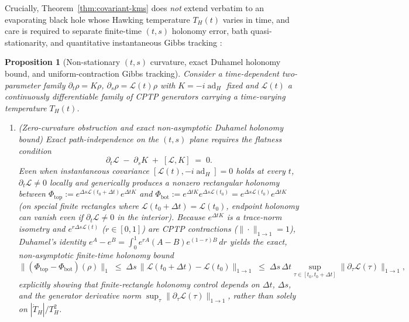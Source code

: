 \documentclass[11pt,a4paper]{article}
\newtheorem{proposition}{Proposition}
\theoremstyle{definition}
\theoremstyle{remark}
\newcommand{\ad}{\operatorname{ad}}
\newcommand{\cL}{\mathcal{L}}
\newcommand{\1}{\mathbf{1}}
\begin{document}
Crucially, Theorem~\ref{thm:covariant-kms} does \emph{not} extend verbatim to an evaporating black hole whose Hawking temperature $T_H(t)$ varies in time, and care is required to separate finite-time $(t,s)$ holonomy error, bath quasi-stationarity, and quantitative instantaneous Gibbs tracking \cite{ChetriteMallick2012,HorowitzSagawa2014}:

\begin{proposition}[Non-stationary $(t,s)$ curvature, exact Duhamel holonomy bound, and uniform-contraction Gibbs tracking]\label{prop:nonstationary}
Consider a time-dependent two-parameter family $\partial_t\rho = K\rho$, $\partial_s\rho = \cL(t)\rho$ with $K = -i\ad_H$ fixed and $\cL(t)$ a continuously differentiable family of CPTP generators carrying a time-varying temperature $T_H(t)$.
\begin{enumerate}
  \item[(a)] \emph{(Zero-curvature obstruction and exact non-asymptotic Duhamel holonomy bound)} Exact path-independence on the $(t,s)$ plane requires the flatness condition
  \begin{equation}\label{eq:flatness}
    \partial_t \cL \;-\; \partial_s K \;+\; [\cL, K] \;=\; 0.
  \end{equation}
  Even when instantaneous covariance $[\cL(t), -i\ad_H] = 0$ holds at every $t$, $\partial_t\cL \neq 0$ locally and generically produces a nonzero rectangular holonomy between $\Phi_{\mathrm{top}}:=e^{\Delta s\cL(t_0+\Delta t)}e^{\Delta t K}$ and $\Phi_{\mathrm{bot}}:=e^{\Delta t K}e^{\Delta s\cL(t_0)}=e^{\Delta s\cL(t_0)}e^{\Delta t K}$ (on special finite rectangles where $\cL(t_0+\Delta t)=\cL(t_0)$, endpoint holonomy can vanish even if $\partial_t\cL\neq 0$ in the interior). Because $e^{\Delta t K}$ is a trace-norm isometry and $e^{r\Delta s\cL(t)}$ ($r\in[0,1]$) are CPTP contractions ($\|\cdot\|_{1\to 1}=1$), Duhamel's identity $e^A-e^B=\int_0^1 e^{rA}(A-B)e^{(1-r)B}\,dr$ yields the \emph{exact, non-asymptotic} finite-time holonomy bound
  \begin{equation}\label{eq:duhamel-holonomy}
    \bigl\|(\Phi_{\mathrm{top}} - \Phi_{\mathrm{bot}})(\rho)\bigr\|_1
    \;\le\; \Delta s\,\bigl\|\cL(t_0+\Delta t) - \cL(t_0)\bigr\|_{1\to 1}
    \;\le\; \Delta s\,\Delta t \sup_{\tau\in[t_0,t_0+\Delta t]}\bigl\|\partial_\tau\cL(\tau)\bigr\|_{1\to 1},
  \end{equation}
  explicitly showing that finite-rectangle holonomy control depends on $\Delta t$, $\Delta s$, and the generator derivative norm $\sup_\tau\|\partial_\tau\cL(\tau)\|_{1\to 1}$, rather than solely on $|\dot{T}_H|/T_H^2$.

\end{enumerate}
\end{proposition}
\end{document}
